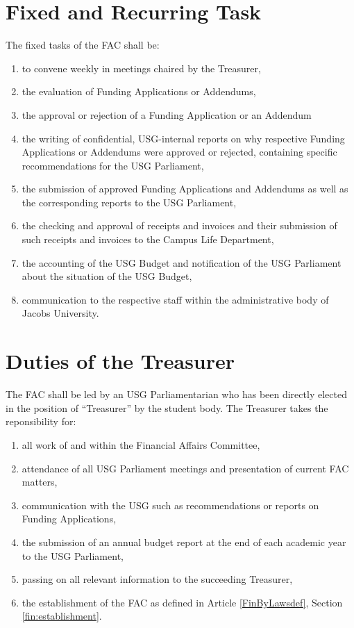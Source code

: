 \documentclass[12pt]{LaTeX_Misc/constitution}
\begin{document}
\section{Fixed and Recurring Task}
The fixed tasks of the FAC shall be: 
\begin{enumerate}
\item to convene weekly in meetings chaired by the Treasurer,
\item the evaluation of Funding Applications or Addendums,
\item the approval or rejection of a Funding Application or an Addendum
\item the writing of confidential, USG-internal reports on why respective Funding Applications or Addendums were approved or rejected, containing specific recommendations for the USG Parliament,
\item the submission of approved Funding Applications and Addendums as well as the corresponding reports to the USG Parliament,
\item the checking and approval of receipts and invoices and their submission of such receipts and invoices to the Campus Life Department,
\item the accounting of the USG Budget and notification of the USG Parliament about the situation of the USG Budget,
\item communication to the respective staff within the administrative body of Jacobs University.
\end{enumerate}

\section{Duties of the Treasurer}
The FAC shall be led by an USG Parliamentarian who has been directly elected in the position of ``Treasurer'' by the student body. The Treasurer takes the reponsibility for:

\begin{enumerate}
\item all work of and within the Financial Affairs Committee,
\item attendance of all USG Parliament meetings and presentation of current FAC matters,
\item communication with the USG such as recommendations or reports on Funding Applications,
\item the submission of an annual budget report at the end of each academic year to the USG Parliament,
\item passing on all relevant information to the succeeding Treasurer,
\item the establishment of the FAC as defined in Article \ref{FinByLawsdef}, Section \ref{fin:establishment}.
\end{enumerate}
\end{document}
